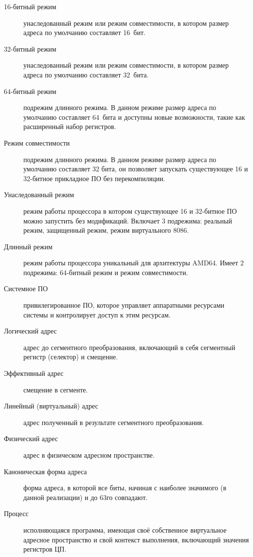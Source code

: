 \Defines
\begin{description}
\item[16-битный режим] унаследованный режим или режим совместимости, в котором размер адреса по умолчанию составляет 16~бит.
\item[32-битный режим] унаследованный режим или режим совместимости, в котором размер адреса по умолчанию составляет 32~бита.
\item[64-битный режим] подрежим длинного режима. В данном режиме размер адреса по умолчанию составляет 64~бита и доступны
новые возможности, такие как расширенный набор регистров.
\item[Режим совместимости] подрежим длинного режима. В данном режиме размер адреса по умолчанию составляет 32 бита, он
позволяет запускать существующее 16 и 32-битное прикладное ПО без перекомпиляции.
\item[Унаследованный режим] режим работы процессора в котором существующее 16 и 32-битное ПО можно запустить без модификаций.
Включает 3 подрежима: реальный режим, защищенный режим, режим виртуального 8086.
\item[Длинный режим] режим работы процессора уникальный для архитектуры AMD64. Имеет 2 подрежима: 64-битный режим и
режим совместимости.
\item[Системное ПО] привилегированное ПО, которое управляет аппаратными ресурсами системы и контролирует доступ к этим ресурсам.
\item[Логический адрес] адрес до сегментного преобразования, включающий в себя сегментный регистр (селектор) и смещение.
\item[Эффективный адрес] смещение в сегменте.
\item[Линейный (виртуальный) адрес] адрес полученный в результате сегментного преобразования.
\item[Физический адрес] адрес в физическом адресном пространстве.
\item[Каноническая форма адреса] форма адреса, в которой все биты, начиная с наиболее значимого (в данной реализации) и до 63го совпадают.
\item[Процесс] исполняющаяся программа, имеющая своё собственное
	виртуальное адресное пространство и свой контекст выполнения, включающий значения регистров ЦП.
\end{description}
